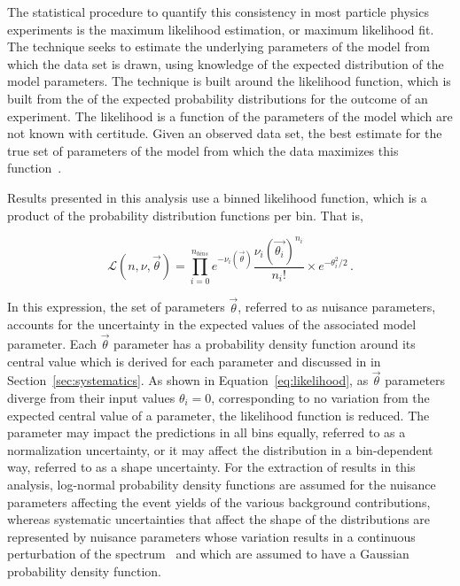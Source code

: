 The statistical procedure to quantify this consistency in most particle 
physics experiments is the maximum likelihood estimation, or maximum
likelihood fit. The technique seeks to estimate the underlying parameters
of the model from which the data set is drawn, using knowledge of the
expected distribution of the model parameters. The technique is built around the
likelihood function, which is built from the
of the expected probability distributions for the
outcome of an experiment. 
The likelihood is a function of the parameters of the model which are not 
known with certitude.
Given an observed data set, the best estimate for 
the true set of parameters of the model from which the data
maximizes this function~\cite{Cranmer:2015nia}.

Results presented in this analysis
use a binned likelihood function, which is a product of the probability
distribution functions per bin. That is,


\begin{equation}
  \mathcal{L}(n, \nu, \vec{\theta}) = \prod_{i=0}^{n_{bins}} 
      e^{-\nu_{i}(\vec{\theta})}\frac{\nu_{i}(\vec{\theta_{i}})^{n_i}}{n_i!} 
      \times e^{-\theta_{i}^2/2} \,.
\label{eq:likelihood}
\end{equation}

In this expression, 
the set of parameters $\vec{\theta}$, referred to as nuisance parameters,
accounts for the uncertainty in the expected values of the associated model parameter.
Each $\vec{\theta}$ parameter has a probability density function around its
central value which is derived for each parameter and discussed in 
in Section~\ref{sec:systematics}.
As shown in Equation~\ref{eq:likelihood}, as $\vec{\theta}$ parameters diverge from
their input values $\theta_i = 0$, corresponding to no variation from the expected 
central value of a parameter, the likelihood function is reduced.
The parameter may impact the predictions in all bins equally,
referred to as a normalization uncertainty, or it may affect the distribution in
a bin-dependent way, referred to as a shape uncertainty.
For the extraction of results in this analysis, log-normal probability density functions are 
assumed for the nuisance parameters affecting 
the event yields of the various background contributions, whereas systematic uncertainties 
that affect the shape of the distributions are represented by nuisance parameters whose 
variation results in a continuous perturbation of the spectrum~\cite{Prosper:2011zz} and which are assumed 
to have a Gaussian probability density function.

